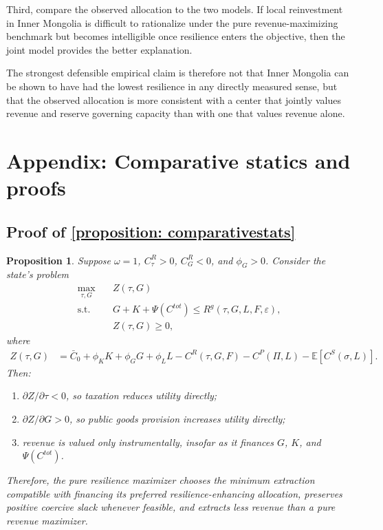 \documentclass[12pt]{article}
\newtheorem{proposition}{Proposition}
\newcommand{\E}{\mathbb{E}}
\begin{document}
Third, compare the observed allocation to the two models. If local reinvestment in Inner Mongolia is difficult to rationalize under the pure revenue-maximizing benchmark but becomes intelligible once resilience enters the objective, then the joint model provides the better explanation.

The strongest defensible empirical claim is therefore not that Inner Mongolia can be shown to have had the lowest resilience in any directly measured sense, but that the observed allocation is more consistent with a center that jointly values revenue and reserve governing capacity than with one that values revenue alone.

\section*{Appendix: Comparative statics and proofs}

\subsection{Proof of \ref{proposition: comparativestats}}

\begin{proposition}
Suppose $\omega = 1$, $C^R_\tau > 0$, $C^R_G < 0$, and $\phi_G>0$. Consider the state's problem
\begin{align}
\max_{\tau,G} \quad & Z(\tau,G) \\
\text{s.t.} \quad & G + K + \Psi(C^{tot}) \le R^g(\tau,G,L,F,\varepsilon), \\
& Z(\tau,G) \ge 0,
\end{align}
where
\begin{align}
Z(\tau,G)
&= \bar C_0 + \phi_K K + \phi_G G + \phi_L L
- C^R(\tau,G,F) - C^P(\Pi,L) - \E[C^S(\sigma,L)].
\end{align}
Then:
\begin{enumerate}
    \item $\partial Z/\partial \tau < 0$, so taxation reduces utility directly;
    \item $\partial Z/\partial G > 0$, so public goods provision increases utility directly;
    \item revenue is valued only instrumentally, insofar as it finances $G$, $K$, and $\Psi(C^{tot})$.
\end{enumerate}
Therefore, the pure resilience maximizer chooses the minimum extraction compatible with financing its preferred resilience-enhancing allocation, preserves positive coercive slack whenever feasible, and extracts less revenue than a pure revenue maximizer.
\end{proposition}
\end{document}
